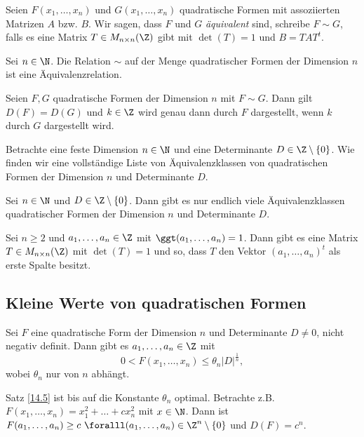 \begin{defn*}
	Seien $F(x_1,\dotsc,x_n)$ und $G(x_1,\dotsc,x_n)$ quadratische Formen mit assoziierten Matrizen $A$ bzw. $B$. Wir sagen, dass $F$ und $G$ \emph{äquivalent} sind, schreibe $F \sim G$, falls es eine Matrix $T \in M_{n \times n}(\Z)$ gibt mit $\det(T) = 1$ und $B = TAT^t$.
\end{defn*}

\begin{lem}\autolabel
	Sei $n \in \N$. Die Relation $\sim$ auf der Menge quadratischer Formen der Dimension $n$ ist eine Äquivalenzrelation.
\end{lem}

\begin{lem}\autolabel
	Seien $F,G$ quadratische Formen der Dimension $n$ mit $F \sim G$. Dann gilt $D(F) = D(G)$ und $k \in \Z$ wird genau dann durch $F$ dargestellt, wenn $k$ durch $G$ dargestellt wird.
\end{lem}

\begin{frage*}
	Betrachte eine feste Dimension $n \in \N$ und eine Determinante $D \in \Z \setminus \{0\}$. Wie finden wir eine vollständige Liste von Äquivalenzklassen von quadratischen Formen der Dimension $n$ und Determinante $D$.
\end{frage*}

\begin{thm}\autolabel
	Sei $n \in \N$ und $D \in \Z\setminus\{0\}$. Dann gibt es nur endlich viele Äquivalenzklassen quadratischer Formen der Dimension $n$ und Determinante $D$.
\end{thm}

\begin{lem}\autolabel
	Sei $n \geq 2$ und $a_1,\dotsc,a_n \in \Z$ mit $\ggt(a_1,\dotsc,a_n)=1$. Dann gibt es eine Matrix $T \in M_{n \times n}(\Z)$ mit $\det(T)  =1$ und so, dass $T$ den Vektor $(a_1,\dotsc,a_n)^t$ als erste Spalte besitzt.
\end{lem}

\subsection*{Kleine Werte von quadratischen Formen}

\begin{thm}\autolabel
	Sei $F$ eine quadratische Form der Dimension $n$ und Determinante $D \neq 0$, nicht negativ definit. Dann gibt es $a_1, \dotsc, a_n \in \Z$ mit
	\[ 0 < F(x_1,\dotsc,x_n) \leq \theta_n |D|^\frac{1}{n}, \]
	wobei $\theta_n$ nur von $n$ abhängt.
\end{thm}

\begin{rem*}
	Satz \ref{14.5} ist bis auf die Konstante $\theta_n$ optimal. Betrachte z.B. $F(x_1,\dotsc,x_n) = x_1^2 + \dotsc + cx_n^2$ mit $x \in \N$. Dann ist $F(a_1,\dotsc,a_n) \geq c \ \foralll (a_1,\dotsc,a_n) \in \Z^n \setminus \{0\}$ und $D(F) = c^n$.
\end{rem*}